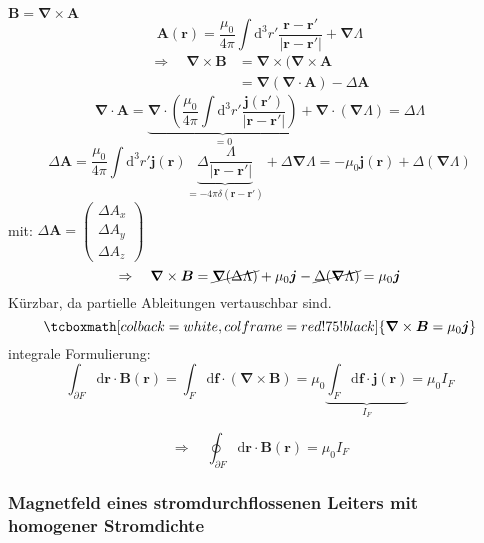 \documentclass[titlepage,11pt,a4paper,ngerman]{report}
\newcommand{\tx}[1]{\textrm{#1}}
\newcommand{\ub}[1]{\underbrace{#1}}
\newcommand{\dd}{\tx{d}}
\renewcommand{\vec}[1]{\boldsymbol{#1}}
\newcommand{\vabla}{\boldsymbol{\nabla}}
\newcommand{\frbox}[2]{\begin{tcolorbox}[colback=white,colframe=red!75!black,fonttitle=\bfseries,title=#1]#2\end{tcolorbox}}
\newcommand{\rmbox}[1]{\tcboxmath[colback=white,colframe=red!75!black]{#1}}
\begin{document}
$ \vec{B} = \vec{\nabla} \times \vec{A} $
\begin{equation*}
\vec{A}(\vec{r}) = \frac{\mu_0}{4 \pi} \int \dd^3 r' \frac{\vec{r} - \vec{r}'}{|\vec{r} - \vec{r}'|} + \vabla \Lambda
\end{equation*}
\begin{align*}
\Rightarrow \quad \vabla \times \vec{B} &= \vabla \times (\vabla \times \vec{A}\\
&= \vabla (\vabla \cdot \vec{A}) - \Delta \vec{A}
\end{align*}
\begin{equation*}
\vabla \cdot \vec{A} = \ub{\vabla \cdot \left(\frac{\mu_0}{4 \pi} \int \dd ^3 r' \frac{\vec{j}(\vec{r}')}{|\vec{r} - \vec{r}'|}\right)}_{=0} + \vabla \cdot (\vabla \Lambda) = \Delta \Lambda 
\end{equation*}
\begin{equation*}
\Delta \vec{A} = \frac{\mu_0}{4 \pi} \int \dd^3 r' \vec{j}(\vec{r}) \ub{\Delta \frac{\Lambda}{|\vec{r} - \vec{r}'|}}_{= - 4 \pi \delta(\vec{r} - \vec{r}')} + \Delta \vabla \Lambda = - \mu_0 \vec{j}(\vec{r}) + \Delta (\vabla \Lambda)
\end{equation*}
mit: $ \Delta \vec{A} = \begin{pmatrix}
\Delta A_x \\ \Delta A_y \\ \Delta A_z
\end{pmatrix} $
\begin{equation*}
\Rightarrow \quad \vabla \times \vec{B} = \cancel{\vabla(\Delta \Lambda)} + \mu_0 \vec{j} - \cancel{\Delta (\vabla \Lambda)} = \mu_0 \vec{j}
\end{equation*}
Kürzbar, da partielle Ableitungen vertauschbar sind.
\begin{equation*}
\rmbox{\vabla \times \vec{B} = \mu_0 \vec{j}}
\end{equation*}
integrale Formulierung:
%
%
\begin{equation*}
\int_{\partial F} \dd \vec{r} \cdot \vec{B} (\vec{r}) = \int_F \dd \vec{f} \cdot (\vec{\nabla} \times \vec{B}) = \mu_0 \ub{\int_F \dd \vec{f} \cdot \vec{j}(\vec{r})}_{I_F} = \mu_0 I_F
\end{equation*}
\frbox{Amper\`esches Durchflutungsgesetz}{
\begin{equation*}
\Rightarrow \quad \oint_{\partial F} \dd \vec{r}\cdot \vec{B}(\vec{r}) = \mu_0 I_F
\end{equation*}
}

\subsubsection{Magnetfeld eines stromdurchflossenen Leiters mit homogener Stromdichte}
\end{document}
